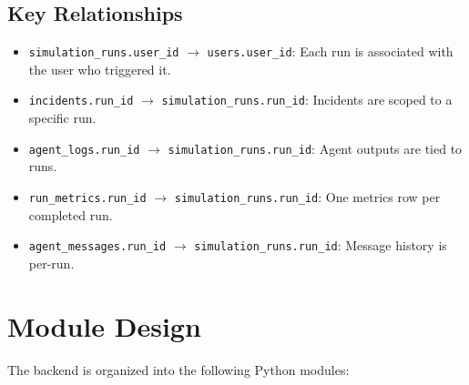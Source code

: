 \subsection{Key Relationships}

\begin{itemize}[leftmargin=*]
    \item \texttt{simulation\_runs.user\_id} $\rightarrow$ \texttt{users.user\_id}: Each run is associated with the user who triggered it.
    \item \texttt{incidents.run\_id} $\rightarrow$ \texttt{simulation\_runs.run\_id}: Incidents are scoped to a specific run.
    \item \texttt{agent\_logs.run\_id} $\rightarrow$ \texttt{simulation\_runs.run\_id}: Agent outputs are tied to runs.
    \item \texttt{run\_metrics.run\_id} $\rightarrow$ \texttt{simulation\_runs.run\_id}: One metrics row per completed run.
    \item \texttt{agent\_messages.run\_id} $\rightarrow$ \texttt{simulation\_runs.run\_id}: Message history is per-run.
\end{itemize}

\section{Module Design}
\label{sec:module_design}

The backend is organized into the following Python modules:

